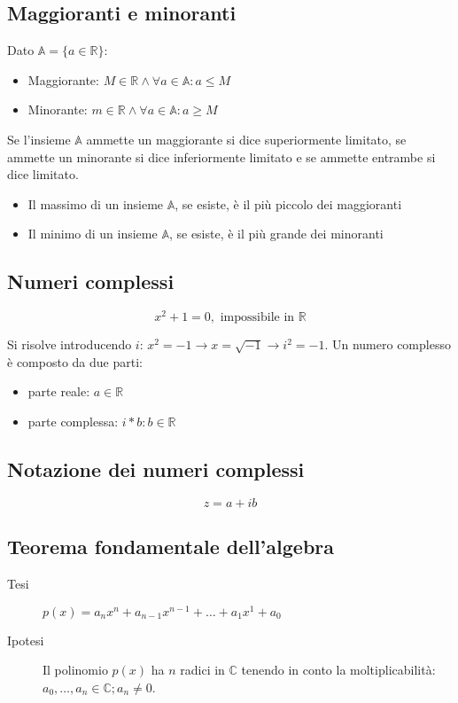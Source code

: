 \documentclass{subfiles}
\begin{document}
\subsection{Maggioranti e minoranti}

Dato $\mathbb{A} = \{ a \in \mathbb{R} \}$:

\begin{itemize}
    \item Maggiorante: $M \in \mathbb{R} \land \forall a \in \mathbb{A} : a \leq M$
    \item Minorante: $m \in \mathbb{R} \land \forall a \in \mathbb{A} : a \geq M$
\end{itemize}

\noindent
Se l'insieme $\mathbb{A}$ ammette un maggiorante si dice superiormente limitato, se ammette un minorante si dice inferiormente limitato e se ammette entrambe si dice limitato.

\begin{itemize}
    \item Il massimo di un insieme $\mathbb{A}$, se esiste, è il più piccolo dei maggioranti
    \item Il minimo di un insieme $\mathbb{A}$, se esiste, è il più grande dei minoranti
\end{itemize}

\subsection{Numeri complessi}

$$
x^2 + 1 = 0, \text{ impossibile in } \mathbb{R}
$$

\noindent
Si risolve introducendo $i$: $x^2 = -1 \to x = \sqrt{-1} \to i^2 = -1$.
Un numero complesso è composto da due parti:

\begin{itemize}
    \item parte reale: $a \in \mathbb{R}$
    \item parte complessa: $i * b : b \in \mathbb{R}$
\end{itemize}

\subsection{Notazione dei numeri complessi}

$$
z = a + ib
$$

\subsection{Teorema fondamentale dell'algebra}

\begin{description}
    \item[Tesi] $p(x) = a_n x^n + a_{n-1} x^{n-1} + \dots + a_1 x^1 + a_0$
    \item[Ipotesi] Il polinomio $p(x)$ ha $n$ radici in $\mathbb{C}$ tenendo in conto la moltiplicabilità: $a_0, \dots , a_n \in \mathbb{C}; a_n \neq 0$.
\end{description}
\end{document}
